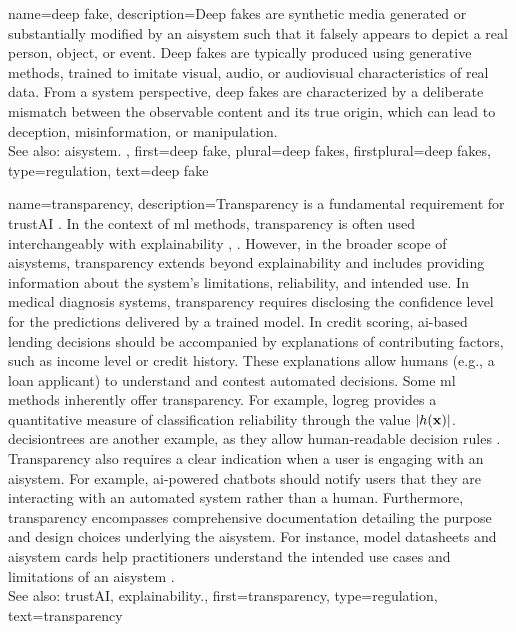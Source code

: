 {name={deep fake},
	description={Deep fakes are synthetic media generated or 
		substantially modified by an \gls{aisystem} such that it falsely appears to depict 
		a real person, object, or \gls{event}. Deep fakes are typically produced using 
             	generative methods, trained to imitate visual, audio, or audiovisual 
            	characteristics of real \gls{data}. From a system perspective, deep fakes are 
            	characterized by a deliberate mismatch between the observable content 
             	and its true origin, which can lead to deception, misinformation, or 
             	manipulation. %
		\\
		See also: \gls{aisystem}. },
 	first={deep fake},
 	plural={deep fakes}, 
 	firstplural={deep fakes},
 	type=regulation,
 	text={deep fake}
}

{name={transparency},
	description={Transparency is a fundamental requirement for 
		\gls{trustAI} \cite{HLEGTrustworhtyAI}. In the context of \gls{ml} 
		methods, transparency is often used interchangeably with \gls{explainability} 
		\cite{JunXML2020}, \cite{gallese2023ai}. However, in the broader scope of \glspl{aisystem}, 
		transparency extends beyond \gls{explainability} and includes providing information 
		about the system’s limitations, reliability, and intended use. 
		In medical diagnosis systems, transparency requires disclosing the confidence level 
		for the \glspl{prediction} delivered by a trained \gls{model}. In credit scoring, 
		\gls{ai}-based lending decisions should be accompanied by \glspl{explanation} of 
		contributing factors, such as income level or credit history. These \glspl{explanation} 
		allow humans (e.g., a loan applicant) to understand and contest automated decisions. 
		Some \gls{ml} methods inherently offer transparency. For example, \gls{logreg} 
		provides a quantitative \gls{measure} of \gls{classification} reliability through the value $|h({\bf x})|$. 
		\Glspl{decisiontree} are another example, as they allow human-readable decision rules \cite{rudin2019stop}.
		Transparency also requires a clear indication when a user is engaging with an \gls{aisystem}. 
		For example, \gls{ai}-powered chatbots should notify users that they are interacting with an 
		automated system rather than a human. Furthermore, transparency encompasses comprehensive 
		documentation detailing the purpose and design choices underlying the \gls{aisystem}. 
		For instance, \gls{model} datasheets \cite{DatasheetData2021} and \gls{aisystem} cards \cite{10.1145/3287560.3287596} 
		help practitioners understand the intended use cases and limitations of an \gls{aisystem} \cite{Shahriari2017}.
					\\ 
		See also: \gls{trustAI}, \gls{explainability}.},
	first={transparency}, 
	type=regulation,
	text={transparency} 
}

